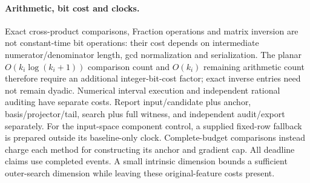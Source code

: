 \paragraph{Arithmetic, bit cost and clocks.}
Exact cross-product comparisons, Fraction operations and matrix inversion are not constant-time bit operations: their cost depends on intermediate numerator/denominator length, gcd normalization and serialization. The planar $O(k_i\log(k_i+1))$ comparison count and $O(k_i)$ remaining arithmetic count therefore require an additional integer-bit-cost factor; exact inverse entries need not remain dyadic. Numerical interval execution and independent rational auditing have separate costs. Report input/candidate plus anchor, basis/projector/tail, search plus full witness, and independent audit/export separately. For the input-space component control, a supplied fixed-row fallback is prepared outside its baseline-only clock. Complete-budget comparisons instead charge each method for constructing its anchor and gradient cap. All deadline claims use completed events. A small intrinsic dimension bounds a sufficient outer-search dimension while leaving these original-feature costs present.
